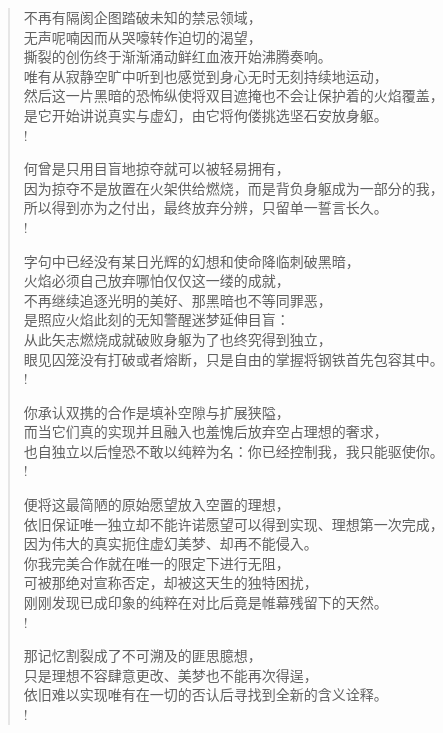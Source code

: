 \documentclass[UTF8, 12pt, a4paper]{ctexrep} %
\begin{document}
\begin{verse}
不再有隔阂企图踏破未知的禁忌领域，\\
无声呢喃因而从哭嚎转作迫切的渴望，\\
撕裂的创伤终于渐渐涌动鲜红血液开始沸腾奏响。\\
唯有从寂静空旷中听到也感觉到身心无时无刻持续地运动，\\
然后这一片黑暗的恐怖纵使将双目遮掩也不会让保护着的火焰覆盖，\\
是它开始讲说真实与虚幻，由它将佝偻挑选坚石安放身躯。\\!

何曾是只用目盲地掠夺就可以被轻易拥有，\\
因为掠夺不是放置在火架供给燃烧，而是背负身躯成为一部分的我，\\
所以得到亦为之付出，最终放弃分辨，只留单一誓言长久。\\!

字句中已经没有某日光辉的幻想和使命降临刺破黑暗，\\
火焰必须自己放弃哪怕仅仅这一缕的成就，\\
不再继续追逐光明的美好、那黑暗也不等同罪恶，\\
是照应火焰此刻的无知警醒迷梦延伸目盲：\\
从此矢志燃烧成就破败身躯为了也终究得到独立，\\
眼见囚笼没有打破或者熔断，只是自由的掌握将钢铁首先包容其中。\\!

你承认双携的合作是填补空隙与扩展狭隘，\\
而当它们真的实现并且融入也羞愧后放弃空占理想的奢求，\\
也自独立以后惶恐不敢以纯粹为名：你已经控制我，我只能驱使你。\\!

便将这最简陋的原始愿望放入空置的理想，\\
依旧保证唯一独立却不能许诺愿望可以得到实现、理想第一次完成，\\
因为伟大的真实扼住虚幻美梦、却再不能侵入。\\
你我完美合作就在唯一的限定下进行无阻，\\
可被那绝对宣称否定，却被这天生的独特困扰，\\
刚刚发现已成印象的纯粹在对比后竟是帷幕残留下的天然。\\!

那记忆割裂成了不可溯及的匪思臆想，\\
只是理想不容肆意更改、美梦也不能再次得逞，\\
依旧难以实现唯有在一切的否认后寻找到全新的含义诠释。\\!


\end{verse}
\end{document}
